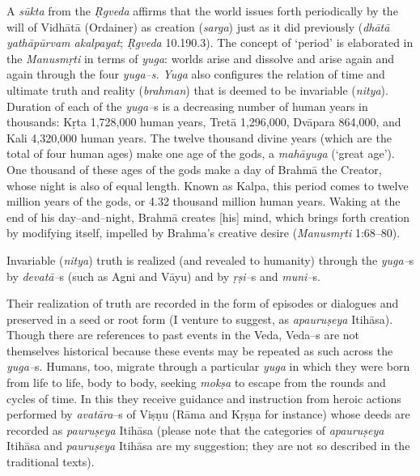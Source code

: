 A \textit{sūkta} from the \textit{Ṛgveda} affirms that the world issues forth periodically by the will of Vidhātā (Ordainer) as creation (\textit{sarga}) just as it did previously (\textit{dhātā yathāpūrvam akalpayat}; \textit{Ṛgveda} 10.190.3). The concept of ‘period’ is elaborated in the \textit{Manusmṛti}  in terms of \textit{yuga}: worlds arise and dissolve and arise again and again through the four \textit{yuga–s.} \textit{Yuga} also configures the relation of time and ultimate truth and reality (\textit{brahman}) that is deemed to be invariable (\textit{nitya}). Duration of each of the \textit{yuga–}s is a decreasing number of human years in thousands: Kṛta 1,728,000 human years, Tretā 1,296,000, Dvāpara 864,000, and Kali 4,320,000 human years. The twelve thousand divine years (which are the total of four human ages) make one age of the gods, a \textit{mahāyuga} (‘great age’). One thousand of these ages of the gods make a day of Brahmā the Creator, whose night is also of equal length. Known as Kalpa, this period comes to twelve million years of the gods, or 4.32 thousand million human years. Waking at the end of his day–and–night, Brahmā creates [his] mind, which brings forth creation by modifying itself, impelled by Brahma’s creative desire (\textit{Manusmṛti}  1:68–80).

Invariable (\textit{nitya}) truth is realized (and revealed to humanity) through the \textit{yuga–}s by \textit{devatā–}s (such as Agni and Vāyu) and by \textit{ṛṣi–}s and \textit{muni–}s.

Their realization of truth are recorded in the form of episodes or dialogues and preserved in a seed or root form (I venture to suggest, as \textit{apauruṣeya} Itihāsa). Though there are references to past events in the Veda, Veda–s are not themselves historical because these events may be repeated as such across the \textit{yuga–}s. Humans, too, migrate through a particular \textit{yuga} in which they were born from life to life, body to body, seeking \textit{mokṣa} to escape from the rounds and cycles of time. In this they receive guidance and instruction from heroic actions performed by \textit{avatāra}–s of Viṣṇu (Rāma and Kṛṣṇa for instance) whose deeds are recorded as \textit{pauruṣeya} Itihāsa (please note that the categories of \textit{apauruṣeya} Itihāsa and \textit{pauruṣeya} Itihāsa are my suggestion; they are not so described in the traditional texts).

